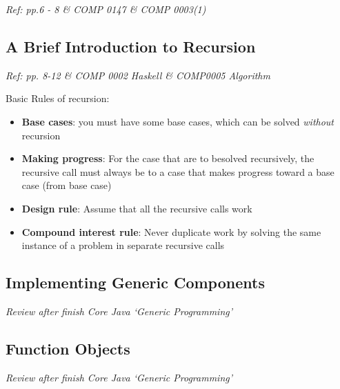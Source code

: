 \documentclass[12pt]{article}
\theoremstyle{definition}
\begin{document}
\emph{Ref: pp.6 - 8 \& COMP 0147 \& COMP 0003(1)}

\subsection{A Brief Introduction to Recursion}
\emph{Ref: pp. 8-12 \& COMP 0002 Haskell \& COMP0005 Algorithm}

Basic Rules of recursion:
\begin{itemize}
    \item \textbf{Base cases}: you must have some base cases, which can be solved \textit{without} recursion
    \item \textbf{Making progress}: For the case that are to besolved recursively, the recursive call must
    always be to a case that makes progress toward a base case (from base case)
    \item \textbf{Design rule}: Assume that all the recursive calls work
    \item \textbf{Compound interest rule}: Never duplicate work by solving the same instance of a problem in separate 
    recursive calls 
\end{itemize}

\subsection{Implementing Generic Components}
\emph{Review after finish Core Java `Generic Programming'}

\subsection{Function Objects}
\emph{Review after finish Core Java `Generic Programming'}
\end{document}
